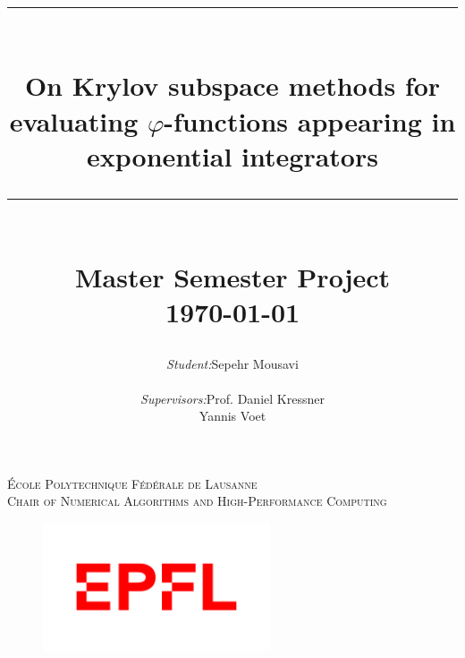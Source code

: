 \documentclass[12pt, a4paper]{article}
\title{
	\rule{\linewidth}{0.5mm}\\
	\Large \textbf{{
		On Krylov subspace methods for evaluating $\varphi$-functions
		appearing in exponential integrators
	}}
	\rule{\linewidth}{0.5mm}\\
	\normalsize {\textbf{Master Semester Project}}\\
	\normalsize \today\\[1.5cm]
}
\author{
	\begin{tabular}{lll}
		\textit{Student:} & Sepehr Mousavi\\
		& \\
		\textit{Supervisors:} & Prof. Daniel Kressner\\
		\textit{} & Yannis Voet\\
	\end{tabular}
}
\begin{document}
	\begin{titlepage}
		\center

		\makeatletter
		\def\printauthor{{\centering \large \@author}}
		\makeatother

		\makeatletter
		\def\printtitle{{\centering \@title\par}}
		\makeatother

		\textsc{
			\large École Polytechnique Fédérale de Lausanne\\
			\large Chair of Numerical Algorithms and High-Performance Computing
		}\\[1cm]
		\vspace{3cm}
		\printtitle
		\vspace{2cm}
		\printauthor
		\vfill
		\begin{figure}[h]
			\centering
			\includegraphics[width = 0.6\textwidth]{img/EPFLlogo.png}
		\end{figure}

	\end{titlepage}

	\tableofcontents
	\listoftodos
	\thispagestyle{plain}
	\newpage

	\begin{abstract}
		
	\end{abstract}

	
	\newpage
	
	\newpage
	\appendix
	
\end{document}
